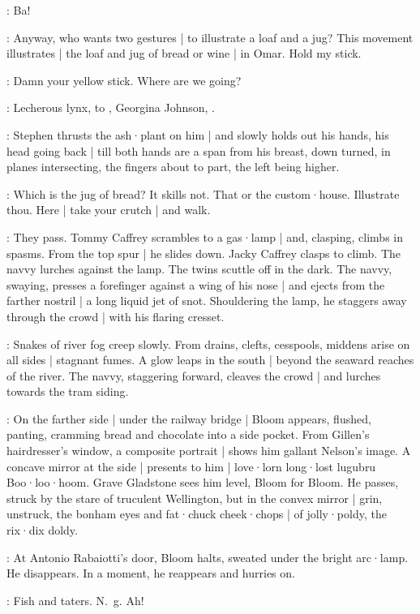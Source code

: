 \Lynch:
Ba!

\Stephen:
Anyway,
who wants two gestures |
to illustrate a loaf and a jug?
This movement illustrates |
the loaf and jug of bread or wine |
in Omar.
Hold my stick.

\Lynch:
Damn your yellow stick.
Where are we going?

\Stephen:
Lecherous lynx,
to ,
Georgina Johnson,
.

:
Stephen thrusts the ash·plant on him |
and slowly holds out his hands,
his head going back |
till both hands are a span from his breast,
down turned,
in planes intersecting,
the fingers about to part,
the left being higher.

\Lynch:
Which is the jug of bread?
It skills not.
That or the custom·house.
Illustrate thou.
Here |
take your crutch |
and walk.

:
They pass.
Tommy Caffrey scrambles to a gas·lamp |
and,
clasping,
climbs in spasms.
From the top spur |
he slides down.
Jacky Caffrey clasps to climb.
The navvy lurches against the lamp.
The twins scuttle off in the dark.
The navvy,
swaying,
presses a forefinger against a wing of his nose |
and ejects from the farther nostril |
a long liquid jet of snot.
Shouldering the lamp,
he staggers away through the crowd |
with his flaring cresset.

:
Snakes of river fog creep slowly.
From drains,
clefts,
cesspools,
middens arise on all sides |
stagnant fumes.
A glow leaps in the south |
beyond the seaward reaches of the river.
The navvy,
staggering forward,
cleaves the crowd |
and lurches towards the tram siding.

:
On the farther side |
under the railway bridge |
Bloom appears,
flushed,
panting,
cramming bread and chocolate into a side pocket.
From Gillen's hairdresser's window,
a composite portrait |
shows him gallant Nelson's image.
A concave mirror at the side |
presents to him |
love·lorn long·lost lugubru Boo·loo·hoom.
Grave Gladstone sees him level,
Bloom for Bloom.
He passes,
struck by the stare of truculent Wellington,
but in the convex mirror |
grin,
unstruck,
the bonham eyes and fat·chuck cheek·chops |
of jolly·poldy,
the rix·dix doldy.

:
At Antonio Rabaiotti's door,
Bloom halts,
sweated under the bright arc·lamp.
He disappears.
In a moment,
he reappears and hurries on.

\Bloom:
Fish and taters.
N.~g.
Ah!

